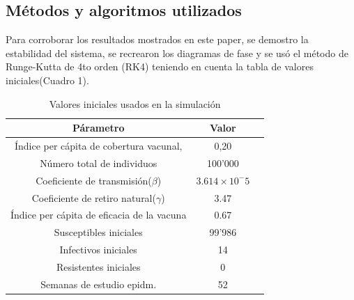 \documentclass{wscpaperproc}
\theoremstyle{wsc}
\begin{document}
\subsection[short]{M\'etodos y algoritmos utilizados}
Para corroborar los resultados mostrados en este paper, se demostro la estabilidad
del sistema, se recrearon los diagramas de fase y
se us\'o el m\'etodo de Runge-Kutta de 4to orden (RK4)
teniendo en cuenta la tabla de valores iniciales(Cuadro 1).
\begin{table}[htbp]
	\centering
	\caption{Valores iniciales usados en la simulación}
	\label{tabla-ejemplo}
	\begin{tabular}{|c|c|c|}
		\hline
		\textbf{Párametro} & \textbf{Valor} \\
		\hline
		\'Indice per c\'apita de cobertura vacunal, & 0,20 \\
		N\'umero total de individuos & 100'000\\
		Coeficiente de transmisi\'on($\beta$) & $ 3.614\times10^-5$\\
		Coeficiente de retiro natural($\gamma$) & 3.47\\
		\'Indice per c\'apita de eficacia de la vacuna & 0.67\\
		Susceptibles iniciales &99'986\\
		Infectivos iniciales & 14\\
		Resistentes iniciales & 0\\
		Semanas de estudio epidm. & 52\\
		\hline
	\end{tabular}
\end{table}
\\
\clearpage
\end{document}
